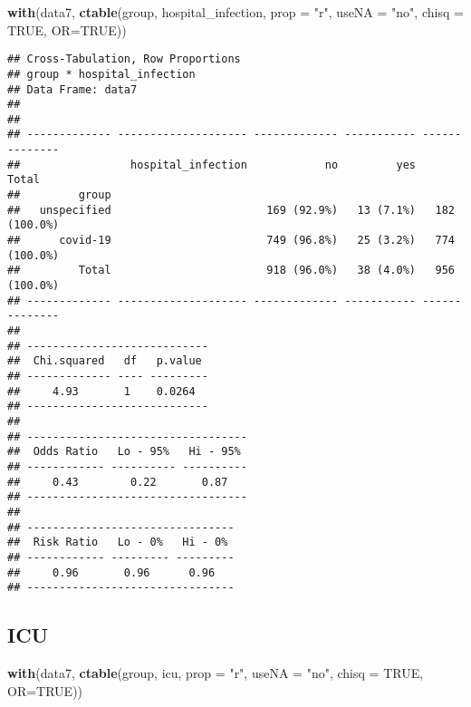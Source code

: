 \documentclass[
]{article}
\newenvironment{Shaded}{\begin{snugshade}}{\end{snugshade}}
\newcommand{\DataTypeTok}[1]{\textcolor[rgb]{0.13,0.29,0.53}{#1}}
\newcommand{\KeywordTok}[1]{\textcolor[rgb]{0.13,0.29,0.53}{\textbf{#1}}}
\newcommand{\NormalTok}[1]{#1}
\newcommand{\OtherTok}[1]{\textcolor[rgb]{0.56,0.35,0.01}{#1}}
\newcommand{\StringTok}[1]{\textcolor[rgb]{0.31,0.60,0.02}{#1}}
\begin{document}
\begin{Shaded}
\begin{Highlighting}[]
\KeywordTok{with}\NormalTok{(data7, }\KeywordTok{ctable}\NormalTok{(group, hospital_infection, }\DataTypeTok{prop =} \StringTok{"r"}\NormalTok{, }\DataTypeTok{useNA =} \StringTok{"no"}\NormalTok{, }\DataTypeTok{chisq =} \OtherTok{TRUE}\NormalTok{, }\DataTypeTok{OR=}\OtherTok{TRUE}\NormalTok{))}
\end{Highlighting}
\end{Shaded}

\begin{verbatim}
## Cross-Tabulation, Row Proportions  
## group * hospital_infection  
## Data Frame: data7  
## 
## 
## ------------- -------------------- ------------- ----------- --------------
##                 hospital_infection            no         yes          Total
##         group                                                              
##   unspecified                        169 (92.9%)   13 (7.1%)   182 (100.0%)
##      covid-19                        749 (96.8%)   25 (3.2%)   774 (100.0%)
##         Total                        918 (96.0%)   38 (4.0%)   956 (100.0%)
## ------------- -------------------- ------------- ----------- --------------
## 
## ----------------------------
##  Chi.squared   df   p.value 
## ------------- ---- ---------
##     4.93       1    0.0264  
## ----------------------------
## 
## ----------------------------------
##  Odds Ratio   Lo - 95%   Hi - 95% 
## ------------ ---------- ----------
##     0.43        0.22       0.87   
## ----------------------------------
## 
## --------------------------------
##  Risk Ratio   Lo - 0%   Hi - 0% 
## ------------ --------- ---------
##     0.96       0.96      0.96   
## --------------------------------
\end{verbatim}

\hypertarget{icu}{%
\subsection{ICU}\label{icu}}

\begin{Shaded}
\begin{Highlighting}[]
\KeywordTok{with}\NormalTok{(data7, }\KeywordTok{ctable}\NormalTok{(group, icu, }\DataTypeTok{prop =} \StringTok{"r"}\NormalTok{, }\DataTypeTok{useNA =} \StringTok{"no"}\NormalTok{, }\DataTypeTok{chisq =} \OtherTok{TRUE}\NormalTok{, }\DataTypeTok{OR=}\OtherTok{TRUE}\NormalTok{))}
\end{Highlighting}
\end{Shaded}
\end{document}
